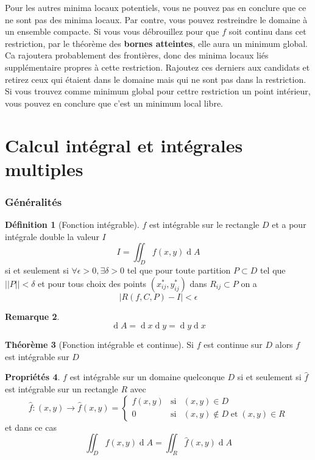 \documentclass[11pt,a4paper]{article}
\theoremstyle{definition}
\newtheorem{mydef}{Définition}%
\newtheorem{myprop}[mydef]{Propriétés}
\newtheorem{myrem}[mydef]{Remarque}
\newtheorem{mytheo}[mydef]{Théorème}
\DeclareMathOperator{\diff}{d}
\newcommand{\dif}{\diff\!}
\begin{document}
Pour les autres minima locaux potentiels, vous ne pouvez pas en conclure que ce ne sont pas des minima locaux.
Par contre, vous pouvez restreindre le domaine à un ensemble compacte.
Si vous vous débrouillez pour que $f$ soit continu dans cet restriction, par le théorème des \textbf{bornes atteintes},
elle aura un minimum global.
Ca rajoutera probablement des frontières, donc des minima locaux liés supplémentaire propres à cette restriction.
Rajoutez ces derniers aux candidats et retirez ceux qui étaient dans le domaine mais qui ne sont pas dans la restriction.
Si vous trouvez comme minimum global pour cettre restriction un point intérieur,
vous pouvez en conclure que c'est un minimum local libre.


\part{Calcul intégral et intégrales multiples}

\section{Généralités}

\begin{mydef}[Fonction intégrable] $f$ est intégrable sur le rectangle $D$ et a pour intégrale double la valeur $I$
	\[ I = \iint_D f(x,y) \dif A \]
	si et seulement si $\forall \epsilon > 0, \exists \delta > 0$ tel que pour toute partition $P \subset D$ tel que $||P|| < \delta$ et pour tous choix des points $(x_{ij}^{*},y_{ij}^{*})$ dans $R_{ij} \subset P$ on a
	\[ |R(f,C,P) - I| < \epsilon \]
\end{mydef}

\begin{myrem}
	\[ \dif A = \dif x \dif y = \dif y \dif x \]
\end{myrem}

\begin{mytheo}[Fonction intégrable et continue]
	Si $f$ est continue sur $D$ alors $f$ est intégrable sur $D$
\end{mytheo}

\begin{myprop} $f$ est intégrable sur un domaine quelconque $D$ si et seulement si $\hat{f}$ est intégrable sur un rectangle $R$ avec
	\[ \hat{f} : (x,y) \to \hat{f}(x,y) = \left\{
	\begin{array}{lll} f(x,y) & \text{si} & (x,y) \in D \\ 0 & \text{si} & (x,y) \notin D  \; \text{et} \; (x,y) \in R
	\end{array}
	\right.
	\]
	et dans ce cas
	\[ \iint_D f(x,y) \dif A = \iint_R \hat{f}(x,y) \dif A \]
\end{myprop}
\end{document}
